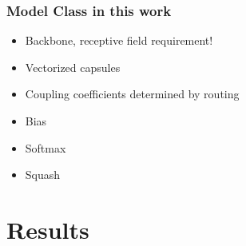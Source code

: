 \documentclass{article}
\begin{document}

\subsubsection*{Model Class in this work}
\begin{itemize}
	\item Backbone, receptive field requirement!
	\item Vectorized capsules
	\item Coupling coefficients determined by routing
	\item Bias
	\item Softmax
	\item Squash
\end{itemize}

\section{Results}
\end{document}
